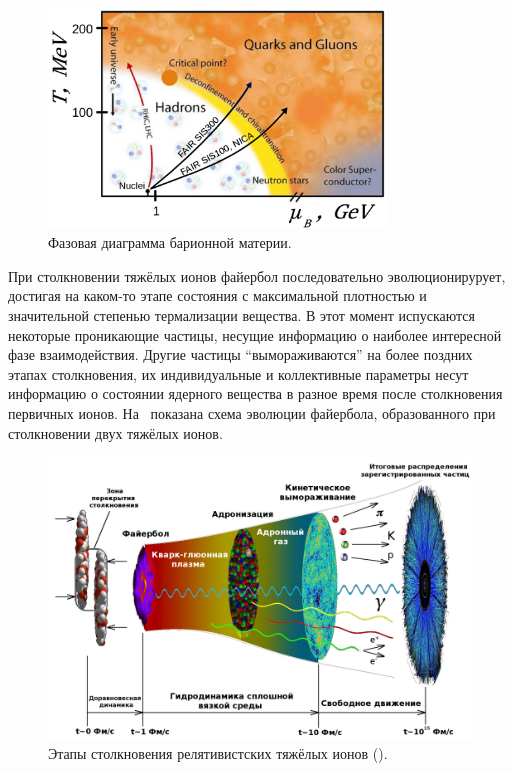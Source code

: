 \begin{figure}[H]
\includegraphics[width=0.8\textwidth]{pictures/QGP_phase_diag_3.png}
\caption{Фазовая диаграмма барионной материи.}
\label{fig:PhaseDiagram}
\end{figure}


При столкновении тяжёлых ионов файербол последовательно эволюционирурует, достигая на каком-то этапе состояния с максимальной плотностью и значительной степенью термализации вещества. В этот момент испускаются некоторые проникающие частицы, несущие информацию о наиболее интересной фазе взаимодействия. Другие частицы ``вымораживаются'' на более поздних этапах столкновения, их индивидуальные и коллективные параметры несут информацию о состоянии ядерного вещества в разное время после столкновения первичных ионов. На~ показана схема эволюции файербола, образованного при столкновении двух тяжёлых ионов.

\begin{figure}[H]
\includegraphics[width=1.0\textwidth]{pictures/little_bang_rus2.png}
\caption{Этапы столкновения релятивистских тяжёлых ионов (\cite{Chen}).}
\label{fig:LittleBang}
\end{figure}

